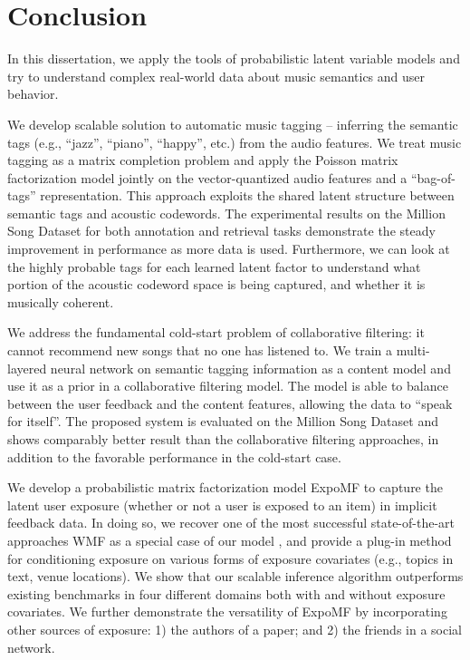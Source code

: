 
\chapter{Conclusion}

In this dissertation, we apply the tools of probabilistic latent variable models and try to understand complex real-world data about music semantics and user behavior. 

We develop scalable solution to automatic music tagging -- inferring the semantic tags (e.g., ``jazz'', ``piano'', ``happy'', etc.) from the audio features. We treat music tagging as a matrix completion problem and apply the Poisson matrix factorization model jointly on the vector-quantized audio features and a ``bag-of-tags'' representation. This approach exploits the shared latent structure between semantic tags and acoustic codewords. The experimental results on the Million Song Dataset for both annotation and retrieval tasks demonstrate the steady improvement in performance as more data is used. Furthermore, we can look at the highly probable tags for each learned latent factor to understand what portion of the acoustic codeword space is being captured, and whether it is musically coherent.

We address the fundamental cold-start problem of collaborative filtering: it cannot recommend new songs that no one has listened to. We train a multi-layered neural network on semantic tagging information as a content model and use it as a prior in a collaborative filtering model. The model is able to balance between the user feedback and the content features, allowing the data to ``speak for itself''. The proposed system is evaluated on the Million Song Dataset and shows comparably better result than the collaborative filtering approaches, in addition to the favorable performance in the cold-start case. 

We develop a probabilistic matrix factorization model ExpoMF to capture the latent user exposure (whether or not a user is exposed to an item) in implicit feedback data. In doing so, we recover one of the most successful state-of-the-art approaches \gls{WMF} as a special case of our model
\citep{hu2008collaborative}, and provide a plug-in method for conditioning
exposure on various forms of exposure covariates (e.g., topics in text,
venue locations). We show that our scalable inference algorithm
outperforms existing benchmarks in four different domains both with and
without exposure covariates. We further demonstrate the versatility of ExpoMF by incorporating other sources of exposure: 1) the authors of a paper; and 2) the friends in a social network. 

